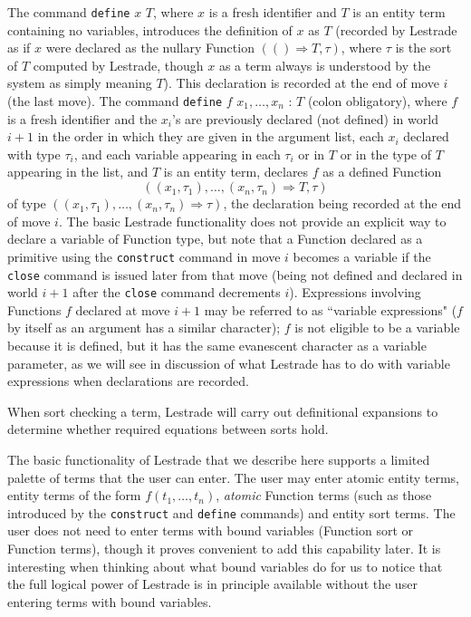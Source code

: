 \documentclass{article}
\begin{document}
The command {\tt define} $x$ $T$, where $x$ is a fresh identifier and $T$ is an entity term containing no variables, introduces the definition of $x$ as $T$ (recorded by Lestrade
as if $x$ were declared as the nullary  Function $(() \Rightarrow T,\tau)$, where $\tau$ is the sort of $T$ computed by Lestrade, though $x$ as a term always is understood by the system as simply meaning $T$).  This declaration is recorded at the end of move $i$ (the last move).
The command {\tt define} $f$ $x_1, \ldots,x_n$ : $T$ (colon obligatory), where $f$ is a fresh identifier and the $x_i$'s are previously declared (not defined) in world $i+1$ in the order in which they are given in the argument list, each $x_i$ declared with type $\tau_i$, and each variable appearing in each $\tau_i$ or in $T$ or in the type of $T$ appearing in the list, and $T$ is an entity term, declares $f$ as a defined Function $$((x_1,\tau_1),\ldots,(x_n,\tau_n) \Rightarrow T,\tau)$$ of type
$((x_1,\tau_1),\ldots,(x_n,\tau_n) \Rightarrow \tau)$, the declaration being recorded at the end of move $i$.  The basic Lestrade functionality does not provide an explicit way to declare a variable of Function type, but note that a Function declared as a primitive using the {\tt construct} command in move $i$ becomes a variable if the {\tt close} command is issued later from that move (being not defined and declared in world $i+1$ after the {\tt close} command decrements $i$).  Expressions involving Functions $f$ declared at move $i+1$ may be referred to as ``variable expressions" ($f$ by itself as an argument has  a similar character);  $f$ is not eligible to be a variable because it is defined, but it has the same evanescent character as a variable parameter, as we will see in discussion of what Lestrade has to do with variable expressions when declarations are recorded.

When sort checking a term, Lestrade will carry out definitional expansions to determine whether required equations between sorts hold.

The basic functionality of Lestrade that we describe here supports a limited palette of terms that the user can enter.  The user may enter atomic entity terms,
entity terms of the form $f(t_1,\ldots,t_n)$, {\em atomic\/} Function terms (such as those introduced by the {\tt construct} and {\tt define} commands) and entity sort terms.  The user does not need to enter terms with bound variables (Function sort or Function terms), though it proves convenient to add this capability later.  It is interesting when thinking about what bound variables do for us to notice that the full logical power of Lestrade is in principle available without the user entering terms with bound variables.  
\end{document}
